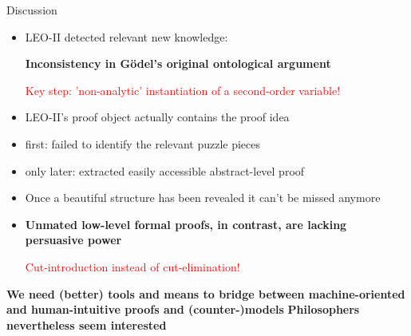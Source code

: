 \documentclass[9pt,mathserif,unknownkeysallowed,xcolor=dvipsnames]{beamer}
\begin{document}
\begin{frame}{Discussion}%
\begin{itemize}
\item LEO-II detected relevant new knowledge: 

\textbf{Inconsistency in G\"odel's original ontological argument}

\textcolor{red}{Key step: 'non-analytic' instantiation of a second-order variable!}

\item LEO-II's proof object actually contains the proof idea 

\item first: failed to identify the relevant puzzle
pieces

\item only later: extracted easily accessible abstract-level proof

\item Once a beautiful structure has
been revealed it can't be missed anymore

\item \textbf{Unmated low-level formal proofs, in contrast, are
    lacking persuasive power}

\textcolor{red}{Cut-introduction instead of  cut-elimination!}
\end{itemize}
\vfill
\textbf{We need (better) tools and means to bridge between
machine-oriented and human-intuitive proofs and (counter-)models}
\vfill
\textbf{Philosophers nevertheless seem interested}
\end{frame}
\end{document}
